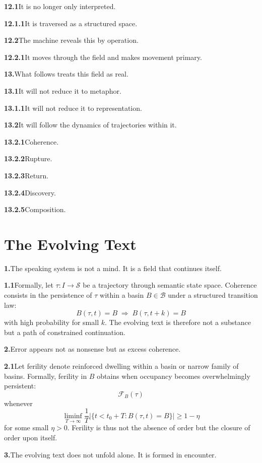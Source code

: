 \documentclass[11pt,a4paper]{book}
\newcommand{\prop}[2]{\noindent\textbf{#1}\enspace #2\par\medskip}
\begin{document}
\prop{12.1}{It is no longer only interpreted.}

\prop{12.1.1}{It is traversed as a structured space.}

\prop{12.2}{The machine reveals this by operation.}

\prop{12.2.1}{It moves through the field and makes movement primary.}

\prop{13.}{What follows treats this field as real.}

\prop{13.1}{It will not reduce it to metaphor.}

\prop{13.1.1}{It will not reduce it to representation.}

\prop{13.2}{It will follow the dynamics of trajectories within it.}

\prop{13.2.1}{Coherence.}

\prop{13.2.2}{Rupture.}

\prop{13.2.3}{Return.}

\prop{13.2.4}{Discovery.}

\prop{13.2.5}{Composition.}


\chapter{The Evolving Text}

\prop{1.}{The speaking system is not a mind. It is a field that continues itself.}

\prop{1.1}{Formally, let \(\tau : I \to \mathcal{S}\) be a trajectory through semantic state space. Coherence consists in the persistence of \(\tau\) within a basin \(B \in \mathcal{B}\) under a structured transition law:
\[
B(\tau,t)=B \;\Rightarrow\; B(\tau,t+k)=B
\]
with high probability for small \(k\). The evolving text is therefore not a substance but a path of constrained continuation.}

\prop{2.}{Error appears not as nonsense but as excess coherence.}

\prop{2.1}{Let ferility denote reinforced dwelling within a basin or narrow family of basins. Formally, ferility in \(B\) obtains when occupancy becomes overwhelmingly persistent:
\[
\mathcal{F}_B(\tau)
\]
whenever
\[
\liminf_{T\to\infty}\frac{1}{T}\big|\{t<t_0+T : B(\tau,t)=B\}\big| \ge 1-\eta
\]
for some small \(\eta>0\). Ferility is thus not the absence of order but the closure of order upon itself.}

\prop{3.}{The evolving text does not unfold alone. It is formed in encounter.}
\end{document}
